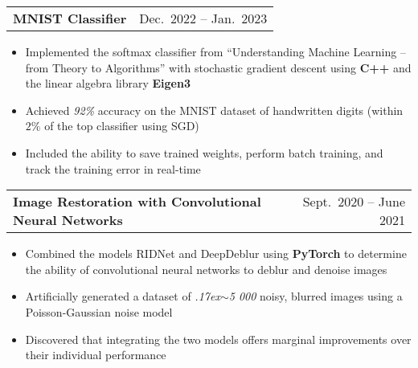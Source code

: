 \documentclass[letterpaper,11pt]{article}
\makeatletter
\newcommand{\resumeItem}[1]{
  \item\small{
    {#1 \vspace{-2pt}}
  }
}
\newcommand{\resumeSubheading}[4]{
  \vspace{-2pt}\item
    \begin{tabular*}{0.97\textwidth}[t]{l@{\extracolsep{\fill}}r}
      \textbf{#1} & #2 \\
      \textit{\small#3} & \textit{\small #4} \\
    \end{tabular*}\vspace{-7pt}
}
\newcommand{\resumeProjectHeading}[2]{
    \item
    \begin{tabular*}{0.97\textwidth}{l@{\extracolsep{\fill}}r}
      \small#1 & #2 \\
    \end{tabular*}\vspace{-7pt}
}
\newcommand{\resumeItemListStart}{\begin{itemize}}
\newcommand{\resumeItemListEnd}{\end{itemize}\vspace{-5pt}}
\makeatother
\begin{document}

    \resumeProjectHeading
      {\textbf{MNIST Classifier} \href{https://github.com/ff-zhang/mnist-classifier}{\footnotesize\faIcon{external-link-alt}}}{\small{Dec.\ 2022 -- Jan.\ 2023}}%
      \resumeItemListStart
        \resumeItem{Implemented the softmax classifier from ``Understanding Machine Learning -- from Theory to Algorithms'' with stochastic gradient descent using \textbf{C++} and the linear algebra library \textbf{Eigen3}}
        \resumeItem{Achieved \emph{92\%} accuracy on the MNIST dataset of handwritten digits (within $2\%$ of the top classifier using SGD)}
        \resumeItem{Included the ability to save trained weights, perform batch training, and track the training error in real-time}
      \resumeItemListEnd

      \resumeProjectHeading
      {\textbf{Image Restoration with Convolutional Neural Networks} \href{https://github.com/ff-zhang/research-code/blob/master/paper.pdf}{\footnotesize\faIcon{external-link-alt}}}{\small{Sept.\ 2020 -- June 2021}}
        \resumeItemListStart
        \resumeItem{Combined the models RIDNet and DeepDeblur using \textbf{PyTorch} to determine the ability of convolutional neural networks to deblur and denoise images}
        \resumeItem{Artificially generated a dataset of \emph{{\raise.17ex\hbox{$\scriptstyle\mathtt{\sim}$}}5 000} noisy, blurred images using a Poisson-Gaussian noise model}
          \resumeItem{Discovered that integrating the two models offers marginal improvements over their individual performance}
        \resumeItemListEnd
\end{document}
